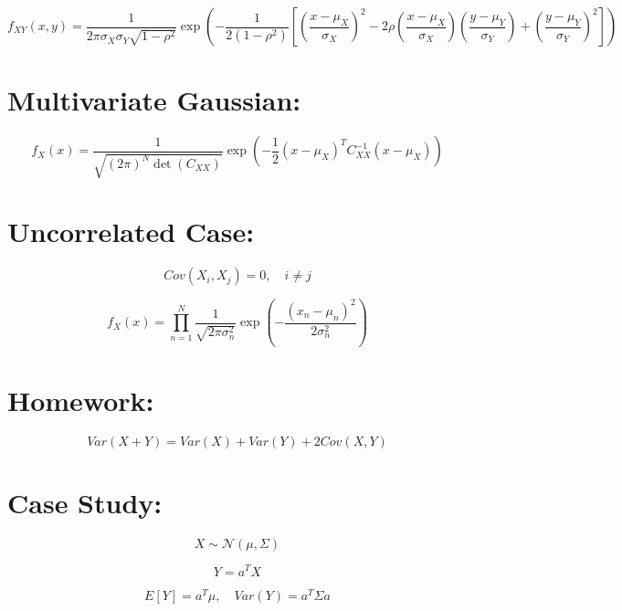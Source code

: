 \documentclass[11pt]{article}
\begin{document}
\[
f_{XY}(x,y) =
\frac{1}{2\pi\sigma_X \sigma_Y \sqrt{1-\rho^2}}
\exp\left(
-\frac{1}{2(1-\rho^2)}
\left[
\left(\frac{x-\mu_X}{\sigma_X}\right)^2
-2\rho\left(\frac{x-\mu_X}{\sigma_X}\right)\left(\frac{y-\mu_Y}{\sigma_Y}\right)
+\left(\frac{y-\mu_Y}{\sigma_Y}\right)^2
\right]
\right)
\]

\section{Multivariate Gaussian:}

\[
f_X(x) =
\frac{1}{\sqrt{(2\pi)^N \det(C_{XX})}}
\exp\left(
-\frac{1}{2}(x-\mu_X)^T C_{XX}^{-1}(x-\mu_X)
\right)
\]

\section{Uncorrelated Case:}

\[
Cov(X_i, X_j) = 0, \quad i \ne j
\]

\[
f_X(x) = \prod_{n=1}^{N}
\frac{1}{\sqrt{2\pi\sigma_n^2}}
\exp\left(-\frac{(x_n-\mu_n)^2}{2\sigma_n^2}\right)
\]

\section{Homework:}

\[
Var(X + Y) = Var(X) + Var(Y) + 2Cov(X,Y)
\]

\section{Case Study:}

\[
X \sim \mathcal{N}(\mu, \Sigma)
\]

\[
Y = a^T X
\]

\[
E[Y] = a^T \mu, \quad Var(Y) = a^T \Sigma a
\]
\end{document}

